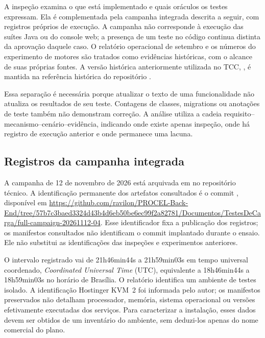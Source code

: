 \documentclass[tcc,capa]{texufpel}
\begin{document}
A inspeção examina o que está implementado e quais oráculos os testes expressam. Ela é complementada pela campanha integrada descrita a seguir, com registros próprios de execução. A campanha não corresponde à execução das suítes Java ou do console web; a presença de um teste no código continua distinta da aprovação daquele caso. O relatório operacional de setembro e os números do experimento de motores são tratados como evidências históricas, com o alcance de suas próprias fontes. A versão histórica anteriormente utilizada no TCC, , é mantida na referência histórica do repositório \cite{probenReadme2026}.

Essa separação é necessária porque atualizar o texto de uma funcionalidade não atualiza os resultados de seu teste. Contagens de classes, migrations ou anotações de teste também não demonstram correção. A análise utiliza a cadeia requisito--mecanismo--cenário--evidência, indicando onde existe apenas inspeção, onde há registro de execução anterior e onde permanece uma lacuna.

\subsection{Registros da campanha integrada}\label{ap:campanha-integrada}
A campanha de 12 de novembro de 2026 está arquivada em  no repositório técnico. A identificação permanente dos artefatos consultados é o commit , disponível em \url{https://github.com/ravilon/PROCEL-Back-End/tree/57b7c3baed3324d43b4d6eb50be6ec99f2a82781/Documentos/TestesDeCarga/full-campaign-20261112-04}. Esse identificador fixa a publicação dos registros; os manifestos consultados não identificam o commit implantado durante o ensaio. Ele não substitui as identificações das inspeções e experimentos anteriores.

O intervalo registrado vai de 21h46min44s a 21h59min03s em tempo universal coordenado, \emph{Coordinated Universal Time} (UTC), equivalente a 18h46min44s a 18h59min03s no horário de Brasília. O relatório identifica um ambiente de testes isolado. A identificação Hostinger KVM~2 foi informada pelo autor; os manifestos preservados não detalham processador, memória, sistema operacional ou versões efetivamente executadas dos serviços. Para caracterizar a instalação, esses dados devem ser obtidos de um inventário do ambiente, sem deduzi-los apenas do nome comercial do plano.
\end{document}

